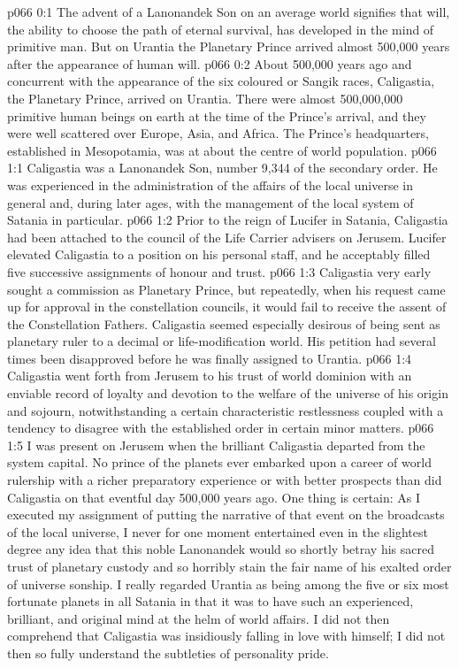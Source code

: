 \author{Melchizedek}
\vs p066 0:1 The advent of a Lanonandek Son on an average world signifies that will, the ability to choose the path of eternal survival, has developed in the mind of primitive man. But on Urantia the Planetary Prince arrived almost 500,000 years after the appearance of human will.
\vs p066 0:2 About 500,000 years ago and concurrent with the appearance of the six coloured or Sangik races, Caligastia, the Planetary Prince, arrived on Urantia. There were almost 500,000,000 primitive human beings on earth at the time of the Prince’s arrival, and they were well scattered over Europe, Asia, and Africa. The Prince’s headquarters, established in Mesopotamia, was at about the centre of world population.
\vs p066 1:1 Caligastia was a Lanonandek Son, number 9,344 of the secondary order. He was experienced in the administration of the affairs of the local universe in general and, during later ages, with the management of the local system of Satania in particular.
\vs p066 1:2 Prior to the reign of Lucifer in Satania, Caligastia had been attached to the council of the Life Carrier advisers on Jerusem. Lucifer elevated Caligastia to a position on his personal staff, and he acceptably filled five successive assignments of honour and trust.
\vs p066 1:3 \pc Caligastia very early sought a commission as Planetary Prince, but repeatedly, when his request came up for approval in the constellation councils, it would fail to receive the assent of the Constellation Fathers. Caligastia seemed especially desirous of being sent as planetary ruler to a decimal or life\hyp{}modification world. His petition had several times been disapproved before he was finally assigned to Urantia.
\vs p066 1:4 Caligastia went forth from Jerusem to his trust of world dominion with an enviable record of loyalty and devotion to the welfare of the universe of his origin and sojourn, notwithstanding a certain characteristic restlessness coupled with a tendency to disagree with the established order in certain minor matters.
\vs p066 1:5 I was present on Jerusem when the brilliant Caligastia departed from the system capital. No prince of the planets ever embarked upon a career of world rulership with a richer preparatory experience or with better prospects than did Caligastia on that eventful day 500,000 years ago. One thing is certain: As I executed my assignment of putting the narrative of that event on the broadcasts of the local universe, I never for one moment entertained even in the slightest degree any idea that this noble Lanonandek would so shortly betray his sacred trust of planetary custody and so horribly stain the fair name of his exalted order of universe sonship. I really regarded Urantia as being among the five or six most fortunate planets in all Satania in that it was to have such an experienced, brilliant, and original mind at the helm of world affairs. I did not then comprehend that Caligastia was insidiously falling in love with himself; I did not then so fully understand the subtleties of personality pride.

